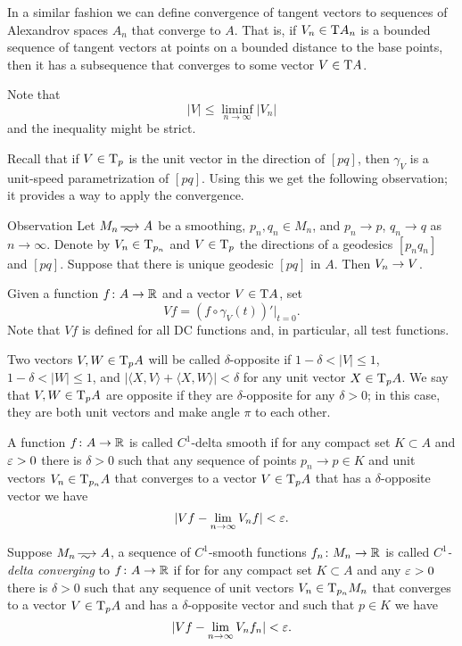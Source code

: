 In a similar fashion we can define convergence of tangent vectors to sequences of Alexandrov spaces $A_n$ that converge to $A$.
That is, if $V_n\in \mathrm{T} A_n$ is a bounded sequence of tangent vectors at points on a bounded distance to the base points, then it has a subsequence that converges to some vector $V\in \mathrm{T} A$.

Note that 
\[|V|\le \liminf_{n\to\infty} |V_n|\]
and the inequality might be strict.

Recall that if $V\in \mathrm{T}_p$ is the unit vector in the direction of $[pq]$, then $\gamma_V$ is a unit-speed parametrization of $[pq]$.
Using this we get the following observation;
it provides a way to apply the convergence.

\begin{thm}{Observation}
Let $M_n\smooths{} A$ be a smoothing, $p_n,q_n\in M_n$, and $p_n\to p$, $q_n\to q$ as $n\to \infty$.
Denote by $V_n\in \mathrm{T}_{p_n}$ and $V\in \mathrm{T}_p$ the directions of a geodesics $[p_nq_n]$ and $[pq]$.
Suppose that there is unique geodesic $[pq]$ in $A$.
Then $V_n\zz\to V$.
\end{thm}



Given a function $f\colon A\to \mathbb{R}$ and a vector $V\in \mathrm{T} A$, set
\[Vf=(f\circ\gamma_V(t))'|_{t=0}.\]
Note that $Vf$ is defined for all DC functions and, in particular, all test functions.

Two vectors $V,W\in \mathrm{T}_pA$ will be called $\delta$-opposite if
$1-\delta< |V|\le 1$,
$1-\delta< |W|\le 1$,
and $|\langle X,V\rangle +\langle X,W\rangle|<\delta$ for any unit vector $X\in \mathrm{T}_p A$.
We say that $V,W\in \mathrm{T}_pA$ are opposite if they are $\delta$-opposite for any $\delta>0$;
in this case, they are both unit vectors and make angle $\pi$ to each other.

A function $f\colon A\to\mathbb{R}$ is called $C^1$-delta smooth if for any compact set $K\subset A$ and $\varepsilon>0$ there is $\delta>0$ such that any sequence of points $p_n\to p\in K$ and unit vectors $V_n\in \mathrm{T}_{p_n} A$ that converges to a vector $V\in \mathrm{T}_p A$ that has a $\delta$-opposite vector we have
\[|Vf-\lim_{n\to\infty} V_nf|<\varepsilon.\]

Suppose $M_n\smooths{} A$, a sequence of $C^1$-smooth functions $f_n\:M_n\zz\to\RR$ is called \emph{$C^1$-delta converging} to $f\colon A\to \mathbb{R}$ if for for any compact set $K\subset A$ and any $\varepsilon>0$ there is $\delta>0$ such that any sequence of unit vectors $V_n\in \mathrm{T}_{p_n} M_n$ that converges to a vector $V\zz\in \T_p A$ and has a $\delta$-opposite vector and such that $p\in K$ we have
\[|Vf-\lim_{n\to\infty} V_nf_n|<\varepsilon.\]

